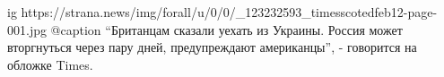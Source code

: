  
 
 
 
 

\ifcmt
  ig https://strana.news/img/forall/u/0/0/_123232593_timesscotedfeb12-page-001.jpg
	@caption \enquote{Британцам сказали уехать из Украины. Россия может вторгнуться через пару дней, предупреждают американцы}, - говорится на обложке Times.
\fi
